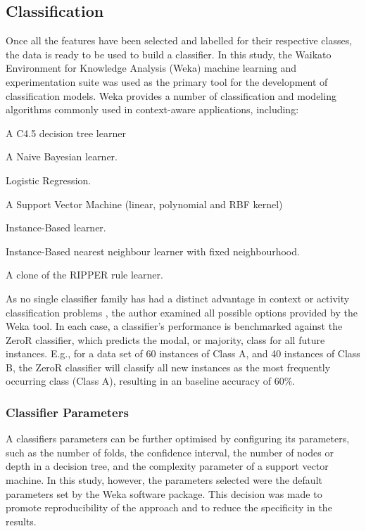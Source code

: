 \subsection{Classification}
Once all the features have been selected and labelled for their respective classes, the data is ready to be used to build a classifier. In this study, the Waikato Environment for Knowledge Analysis (Weka)  machine learning and experimentation suite \cite{Hornik2009} was used as the primary tool for the development of classification models. Weka provides a number of classification and modeling algorithms commonly used in context-aware applications, including:
\begin{description}[noitemsep,topsep=0pt]
	\item [J48] A C4.5 decision tree learner
	\item [NaiveBayes] A Naive Bayesian learner.
	\item [Logistic] Logistic Regression.
	\item [SMO] A Support Vector Machine (linear, polynomial and RBF kernel)
	\item [KStar] Instance-Based learner.
	\item [IBk] Instance-Based nearest neighbour learner with fixed neighbourhood.
	\item [JRip] A clone of the RIPPER rule learner.
\end{description}

As no single classifier family has had a distinct advantage in context or activity classification problems \cite{Mitchell2013a}, the author examined all possible options provided by the Weka tool. In each case, a classifier's performance is benchmarked against the ZeroR classifier, which predicts the modal, or majority, class for all future instances. E.g., for a data set of 60 instances of Class A, and 40 instances of Class B, the ZeroR classifier will classify all new instances as the most frequently occurring class (Class A), resulting in an baseline accuracy of 60\%.

\subsubsection{Classifier Parameters}
A classifiers parameters can be further optimised by configuring its parameters, such as the number of folds, the confidence interval, the number of nodes or depth in a decision tree, and the complexity parameter of a support vector machine. In this study, however, the parameters selected were the default parameters set by the Weka software package. This decision was made to promote reproducibility of the approach and to reduce the specificity in the results.

